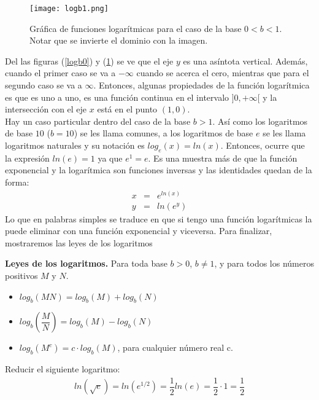  \begin{center}
\begin{figure}[h!]
\centering
\texttt{[image: logb1.png]}
\caption[Gráfica de funciones logarítmicas para el caso de la base $0<b<1$]{Gráfica de funciones logarítmicas para el caso de la base $0<b<1$. Notar que se invierte el dominio con la imagen.} \label{logb1}
\end{figure}
\end{center}

Del las figuras (\ref{logb0}) y (\ref{logb1}) se ve que el eje $y$ es una asíntota vertical. Además, cuando el primer caso se va a $-\infty$ cuando se acerca el cero, mientras que para el segundo caso se va a $\infty$. Entonces, algunas propiedades de la función logarítmica es que es uno a uno, es una función continua en el intervalo $]0,+\infty[$ y la intersección con el eje $x$ está en el punto $(1,0)$.\\

Hay un caso particular dentro del caso de la base $b>1$. Así como los logaritmos de base $10$ ($b=10$) se les llama comunes, a los logaritmos de base $e$ se les llama logaritmos naturales y su notación es $log_{e}(x)=ln(x)$. Entonces, ocurre que la expresión $ln(e)=1$ ya que $e^{1}=e$. Es una muestra más de que la función exponencial y la logarítmica son funciones inversas y las identidades quedan de la forma:
\begin{eqnarray}
x&=&e^{ln(x)}\\
y&=&ln(e^{y})
\end{eqnarray}
Lo que en palabras simples se traduce en que si tengo una función logarítmicas la puede eliminar con una función exponencial y viceversa. Para finalizar, mostraremos las leyes de los logaritmos

\begin{mydef}
\textbf{Leyes de los logaritmos. } Para toda base $b>0$, $b\neq 1$, y para todos los números positivos $M$ y $N$.
\begin{itemize}
	\item $log_{b}(MN)=log_{b}(M)+log_{b}(N)$
	\item $log_{b}\left(\dfrac{M}{N}\right)=log_{b}(M)-log_{b}(N)$
	\item $log_{b}(M^{c})=c\cdot log_{b}(M)$, para cualquier número real c.\\
\end{itemize}
\end{mydef}

\begin{myexample}
Reducir el siguiente logaritmo:
\begin{eqnarray}
ln(\sqrt{e})=ln(e^{1/2})=\dfrac{1}{2}ln(e)=\dfrac{1}{2}\cdot 1=\dfrac{1}{2}
\end{eqnarray}
\end{myexample}

